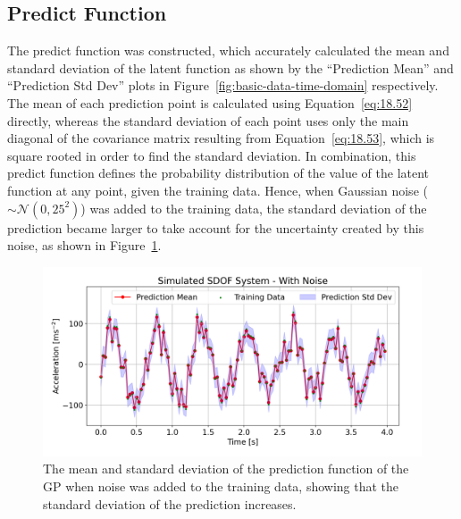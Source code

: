 \documentclass[12pt]{article}
\begin{document}
    \subsection{Predict Function}
    The predict function was constructed, which accurately calculated the mean and standard deviation of the latent function as shown by the ``Prediction Mean'' and ``Prediction Std Dev'' plots in Figure~\ref{fig:basic-data-time-domain} respectively.
    The mean of each prediction point is calculated using Equation~\ref{eq:18.52} directly, whereas the standard deviation of each point uses only the main diagonal of the covariance matrix resulting from Equation~\ref{eq:18.53}, which is square rooted in order to find the standard deviation.
    In combination, this predict function defines the probability distribution of the value of the latent function at any point, given the training data.
    Hence, when Gaussian noise ($\sim \mathcal{N}(0, 25^{2})$) was added to the training data, the standard deviation of the prediction became larger to take account for the uncertainty created by this noise, as shown in Figure~\ref{fig:noisy-data-time-domain}.



    \begin{figure}[h]
        \centering
        \includegraphics[width=1.0\linewidth]{figures/noisy-data-time-domain/noisy-data-time-domain.png}
        \caption{The mean and standard deviation of the prediction function of the GP when noise was added to the training data, showing that the standard deviation of the prediction increases.}
        \label{fig:noisy-data-time-domain}
    \end{figure}
\end{document}
